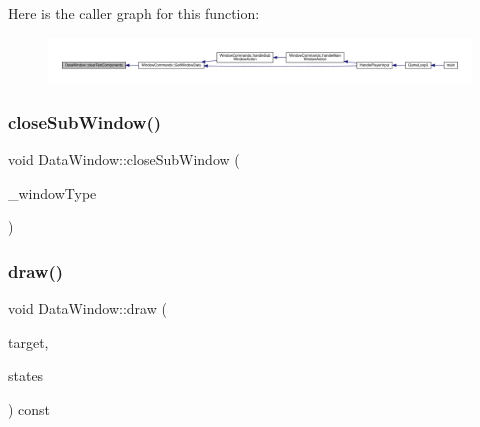 Here is the caller graph for this function\+:
\nopagebreak
\begin{figure}[H]
\begin{center}
\leavevmode
\includegraphics[width=350pt]{class_data_window_a2f7b8defc928dcf530149a82bdd16d53_icgraph}
\end{center}
\end{figure}
\mbox{\label{class_data_window_a1afcf0423ba1ad8b18792bb4ba73c314}} 
\subsubsection{\texorpdfstring{close\+Sub\+Window()}{closeSubWindow()}}
{\footnotesize\ttfamily void Data\+Window\+::close\+Sub\+Window (\begin{DoxyParamCaption}\item[{\mbox{\hyperlink{_data_window_8hpp_a3c1e0c6fe947fdbea7502497b27cf44d}{En\+Data\+Window\+Type}}}]{\+\_\+window\+Type }\end{DoxyParamCaption})}

\mbox{\label{class_data_window_a90b82a1d6d1831317002e3badc18c474}} 
\subsubsection{\texorpdfstring{draw()}{draw()}}
{\footnotesize\ttfamily void Data\+Window\+::draw (\begin{DoxyParamCaption}\item[{sf\+::\+Render\+Target \&}]{target,  }\item[{sf\+::\+Render\+States}]{states }\end{DoxyParamCaption}) const\hspace{0.3cm}{\ttfamily [virtual]}}

\mbox{\label{class_data_window_ab3ad6b28f3a4c54f692d623b4af48779}} 
